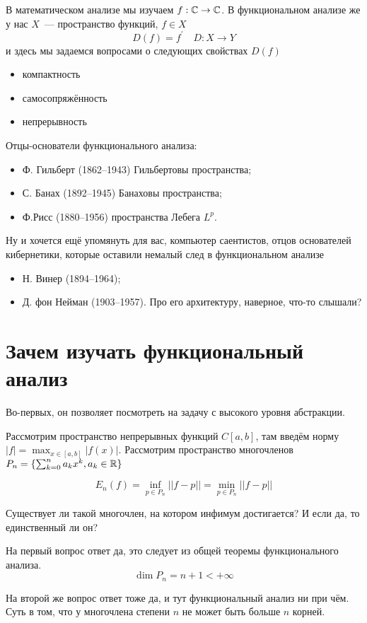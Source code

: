 \documentclass[document]{subfiles}
\begin{document}
В математическом анализе мы изучаем $f: \mathbb{C} \rightarrow \mathbb{C}$.
В функциональном анализе же у нас $X$~--- пространство функций, $f \in X$
   \[ D(f) =  f^\prime \quad D: X \rightarrow Y \]
и здесь мы задаемся вопросами о следующих свойствах $D(f)$
\begin{itemize}
    \item компактность
    \item самосопряжённость
    \item непрерывность
\end{itemize}


Отцы-основатели функционального анализа:
\begin{itemize}
    \item Ф. Гильберт (1862--1943) Гильбертовы пространства;
    \item С. Банах (1892--1945) Банаховы пространства;
    \item Ф.Рисс (1880--1956) пространства Лебега $L^p$.
\end{itemize}
Ну и хочется ещё упомянуть для вас, компьютер саентистов, отцов основателей кибернетики, которые оставили немалый след в функциональном анализе
\begin{itemize}
    \item Н. Винер (1894--1964);
    \item Д. фон Нейман (1903--1957). Про его архитектуру, наверное, что-то слышали?
\end{itemize}

\section{Зачем изучать функциональный анализ}
Во-первых, он позволяет посмотреть на задачу с высокого уровня абстракции.

Рассмотрим пространство непрерывных функций $C[a,b]$, там введём норму $|f| = \max_{x \in [a,b]} | f(x)|.$ Рассмотрим пространство многочленов $P_n = \{ \sum^n_{k=0} a_kx^k, a_k \in \mathbb{R} \}$

\[ E_n (f) = \inf_{p \in P_n} || f - p||  = \min_{p \in P_n} ||f - p|| \]

Существует ли такой многочлен, на котором инфимум достигается? И если да, то единственный ли он? 

На первый вопрос ответ да, это следует из общей теоремы функционального анализа. 
\[ \dim P_n = n + 1 < + \infty \]

На второй же вопрос ответ тоже да, и тут функциональный анализ ни при чём. Суть в том, что у многочлена степени $n$ не может быть больше $n$ корней.
\end{document}
